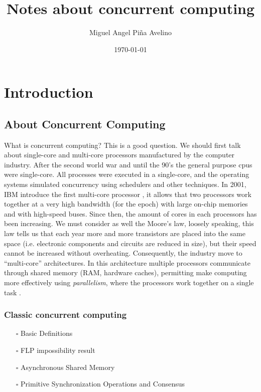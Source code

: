 \documentclass[openany, a4paper]{book}
\author{Miguel Angel Piña Avelino}
\date{\today}
\title{Notes about concurrent computing}
\theoremstyle{break}
\theoremstyle{example}
\theoremstyle{note}
\theoremstyle{break}
\theoremstyle{exercise}
\begin{document}
\maketitle
\tableofcontents


\part{Introduction}
\label{sec:org73a335d}

\chapter{About Concurrent Computing}
\label{sec:org36542ba}

What is concurrent computing? This is a good question. We should first talk
about single-core and multi-core processors manufactured by the computer
industry. After the second world war and until the 90's the general purpose
cpus were single-core. All processes were executed in a single-core, and the
operating systems simulated concurrency using schedulers and other
techniques. In 2001, IBM introduce the first multi-core processor
\cite{ibmIBM100Power}, it allows that two processors work together at a very
high bandwidth (for the epoch) with large on-chip memories and with
high-speed buses. Since then, the amount of cores in each processors has been
increasing. We must consider as well the Moore's law, loosely speaking, this
law tells us that each year more and more transistors are placed into the
same space (i.e. electronic components and circuits are reduced in size), but
their speed cannot be increased without overheating. Consequently, the
industry move to ``multi-core'' architectures. In this architecture multiple
processors communicate through shared memory (RAM, hardware caches),
permitting make computing more effectively using \emph{parallelism}, where the
processors work together on a single task \cite{DBLP_books_daglib_0020056}.

\section{Classic concurrent computing}
\label{sec:orgb32cbc9}

\begin{itemize}
\item[{$\square$}] Basic Definitions
\item[{$\square$}] FLP impossibility result
\item[{$\square$}] Asynchronous Shared Memory
\item[{$\square$}] Primitive Synchronization Operations and Consensus
\end{itemize}
\end{document}
